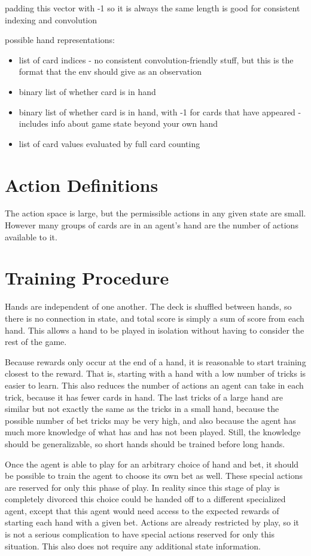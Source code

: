 \documentclass[10pt]{article} %
\begin{document}
padding this vector with -1 so it is always the same length is good for consistent indexing and convolution

possible hand representations:

\begin{itemize}
\item list of card indices - no consistent convolution-friendly stuff, but this is the format that the env should give as an observation
\item binary list of whether card is in hand
\item binary list of whether card is in hand, with -1 for cards that have appeared - includes info about game state beyond your own hand
\item list of card values evaluated by full card counting
\end{itemize}

\section{Action Definitions}

The action space is large, but the permissible actions in any given state are small. However many groups of cards are in an agent’s hand are the number of actions available to it.

\section{Training Procedure}

Hands are independent of one another. The deck is shuffled between hands, so there is no connection in state, and total score is simply a sum of score from each hand. This allows a hand to be played in isolation without having to consider the rest of the game.

Because rewards only occur at the end of a hand, it is reasonable to start training closest to the reward. That is, starting with a hand with a low number of tricks is easier to learn. This also reduces the number of actions an agent can take in each trick, because it has fewer cards in hand. The last tricks of a large hand are similar but not exactly the same as the tricks in a small hand, because the possible number of bet tricks may be very high, and also because the agent has much more knowledge of what has and has not been played. Still, the knowledge should be generalizable, so short hands should be trained before long hands.

Once the agent is able to play for an arbitrary choice of hand and bet, it should be possible to train the agent to choose its own bet as well. These special actions are reserved for only this phase of play. In reality since this stage of play is completely divorced this choice could be handed off to a different specialized agent, except that this agent would need access to the expected rewards of starting each hand with a given bet. Actions are already restricted by play, so it is not a serious complication to have special actions reserved for only this situation. This also does not require any additional state information.
\end{document}
